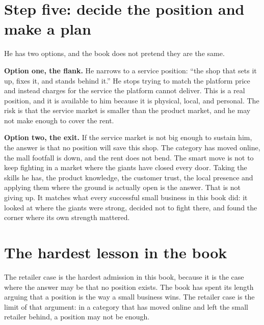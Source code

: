 \documentclass[10pt,twoside,openany]{memoir}
\newcommand{\needspacehead}{\needspace{4\baselineskip}}
\let\oldsection\section
\renewcommand{\section}{\needspacehead\oldsection}
\begin{document}
{\section{Step five: decide the position and make a
plan}\label{step-five-decide-the-position-and-make-a-plan-3}

He has two options, and the book does not pretend they are the same.

\textbf{Option one, the flank.} He narrows to a service position: ``the
shop that sets it up, fixes it, and stands behind it.'' He stops trying
to match the platform price and instead charges for the service the
platform cannot deliver. This is a real position, and it is available to
him because it is physical, local, and personal. The risk is that the
service market is smaller than the product market, and he may not make
enough to cover the rent.

\textbf{Option two, the exit.} If the service market is not big enough
to sustain him, the answer is that no position will save this shop. The
category has moved online, the mall footfall is down, and the rent does
not bend. The smart move is not to keep fighting in a market where the
giants have closed every door. Taking the skills he has, the product
knowledge, the customer trust, the local presence and applying them
where the ground is actually open is the answer. That is not giving up.
It matches what every successful small business in this book did: it
looked at where the giants were strong, decided not to fight there, and
found the corner where its own strength mattered.

\section{The hardest lesson in the
book}\label{the-hardest-lesson-in-the-book}

The retailer case is the hardest admission in this book, because it is
the case where the answer may be that no position exists. The book has
spent its length arguing that a position is the way a small business
wins. The retailer case is the limit of that argument: in a category
that has moved online and left the small retailer behind, a position may
not be enough.

}
\end{document}
